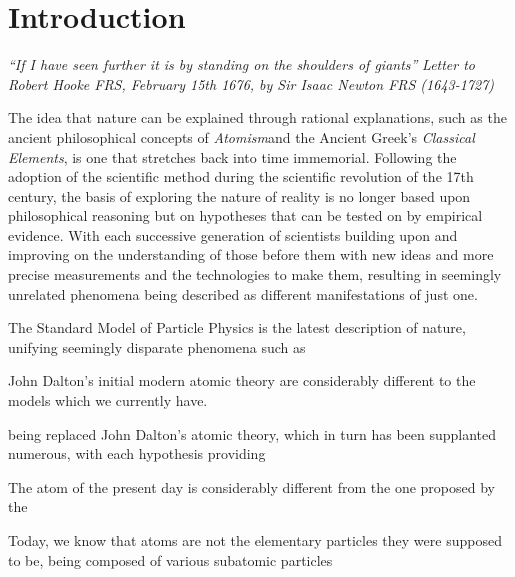 \chapter{Introduction}\label{chapter:intro}

\emph{``If I have seen further it is by standing on the shoulders of giants''}
\emph{Letter to Robert Hooke FRS, February 15th 1676, by Sir Isaac Newton FRS (1643-1727)}

The idea that nature can be explained through rational explanations, such as the ancient philosophical concepts of \emph{Atomism}and the Ancient Greek's \emph{Classical Elements}, is one that stretches back into time immemorial.
Following the adoption of the scientific method during the scientific revolution of the 17th century, the basis of  exploring the nature of reality is no longer based upon philosophical reasoning but on hypotheses that can be tested on by empirical evidence.
With each successive generation of scientists building upon and improving on the understanding of those before them with new ideas and more precise measurements and the technologies to make them, resulting in seemingly unrelated phenomena being described as different manifestations of just one.



The Standard Model of Particle Physics is the latest description of nature, unifying seemingly disparate phenomena such as

 John Dalton's initial modern atomic theory are considerably different to the models which we currently have.


being replaced John Dalton's atomic theory, which in turn has been supplanted numerous, with each hypothesis providing 

The atom of the present day is considerably different from the one proposed by the


Today, we know that atoms are not the elementary particles they were supposed to be, being composed of various subatomic particles

